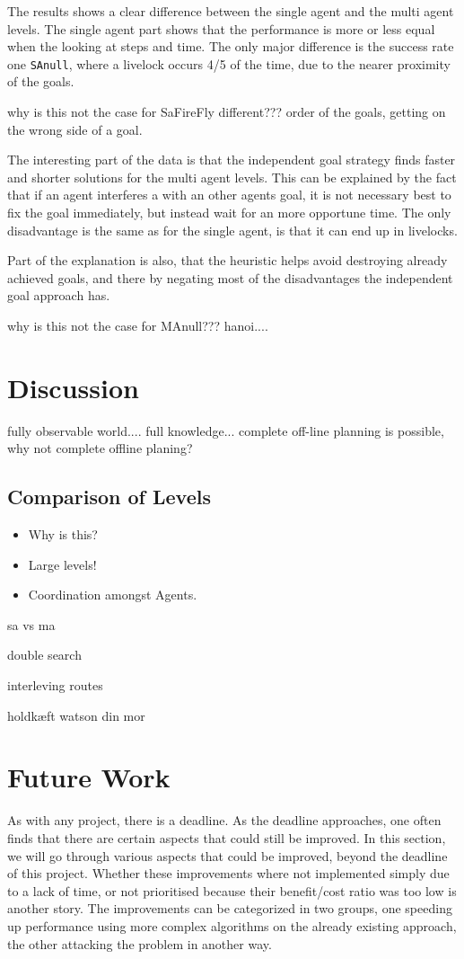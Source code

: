 \documentclass[letterpaper]{article}
\begin{document}
		The results shows a clear difference between the single agent and the multi agent levels. 
		The single agent part shows that the performance is more or less equal when the looking at steps and time. The only major difference is the success rate one \verb=SAnull=, where a livelock occurs 4/5 of the time, due to the nearer proximity of the goals.
		
		why is this not the case for SaFireFly different???
		order of the goals, getting on the wrong side of a goal.
		
		The interesting part of the data is that the independent goal strategy finds faster and shorter solutions for the multi agent levels. This can be explained by the fact that if an agent interferes a with an other agents goal, it is not necessary best to fix the goal immediately, but instead wait for an more opportune time.	The only disadvantage is the same as for the single agent, is that it can end up in livelocks.
		
		Part of the explanation is also, that the heuristic helps avoid destroying already achieved goals, and there by negating most of the disadvantages the independent goal approach has. 
		
		why is this not the case for MAnull???
		hanoi....
	
	
\section{Discussion}
	\label{disscussion}
	fully observable world.... full knowledge... complete off-line planning is possible, why not complete offline planing?
	\subsection{Comparison of Levels}
	\begin{itemize}
		\item{Why is this?}
		\item{Large levels!}
		\item{Coordination amongst Agents.}
	\end{itemize}
sa vs ma


double search

interleving routes


holdkæft
watson
din mor

\section{Future Work}
	As with any project, there is a deadline. As the deadline approaches, one often finds that there are certain aspects that could still be improved. In this section, we will go through various aspects that could be improved, beyond the deadline of this project. Whether these improvements where not implemented simply due to a lack of time, or not prioritised because their benefit/cost ratio was too low is another story. The improvements can be categorized in two groups, one speeding up performance using more complex algorithms on the already existing approach, the other attacking the problem in another way.
	
\end{document}
